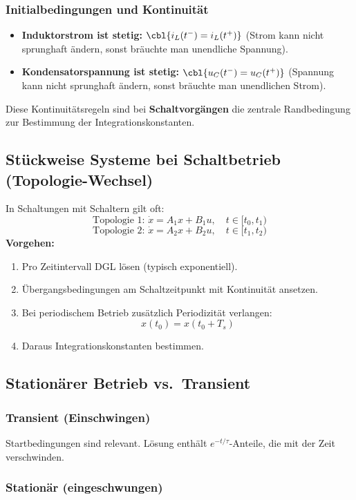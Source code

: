 \subsubsection{Initialbedingungen und Kontinuität}
\begin{itemize}
    \item \textbf{Induktorstrom ist stetig:} $\cbl{i_L(t^-)=i_L(t^+)}$ (Strom kann nicht sprunghaft ändern, sonst bräuchte man unendliche Spannung).
    \item \textbf{Kondensatorspannung ist stetig:} $\cbl{u_C(t^-)=u_C(t^+)}$ (Spannung kann nicht sprunghaft ändern, sonst bräuchte man unendlichen Strom).
\end{itemize}
Diese Kontinuitätsregeln sind bei \textbf{Schaltvorgängen} die zentrale Randbedingung zur Bestimmung der Integrationskonstanten.

\subsection{Stückweise Systeme bei Schaltbetrieb (Topologie-Wechsel)}

In Schaltungen mit Schaltern gilt oft:
\[
\text{Topologie 1: } \dot{x}=A_1 x + B_1 u,\quad t\in[t_0,t_1)
\]
\[
\text{Topologie 2: } \dot{x}=A_2 x + B_2 u,\quad t\in[t_1,t_2)
\]
\textbf{Vorgehen:}
\begin{enumerate}
    \item Pro Zeitintervall DGL lösen (typisch exponentiell).
    \item Übergangsbedingungen am Schaltzeitpunkt mit Kontinuität ansetzen.
    \item Bei periodischem Betrieb zusätzlich Periodizität verlangen:
    \[
    x(t_0)=x(t_0+T_s)
    \]
    \item Daraus Integrationskonstanten bestimmen.
\end{enumerate}

\subsection{Stationärer Betrieb vs.\ Transient}

\subsubsection{Transient (Einschwingen)}
Startbedingungen sind relevant. Lösung enthält $e^{-t/\tau}$-Anteile, die mit der Zeit verschwinden.

\subsubsection{Stationär (eingeschwungen)}

